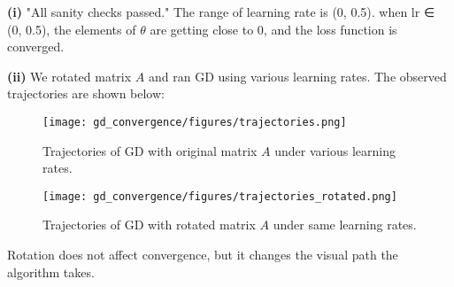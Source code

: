 \begin{answer}
\textbf{(i)}  
"All sanity checks passed."
The range of learning rate is (0, 0.5).
when lr ∈ (0, 0.5), the elements of \(\theta\) are getting close to 0, and the loss function is converged.


\textbf{(ii)}  
We rotated matrix $A$ and ran GD using various learning rates. The observed trajectories are shown below:

\begin{figure}[H]
  \centering
  \texttt{[image: gd\_convergence/figures/trajectories.png]}
  \caption{Trajectories of GD with original matrix $A$ under various learning rates.}
\end{figure}

\begin{figure}[H]
  \centering
  \texttt{[image: gd\_convergence/figures/trajectories\_rotated.png]}
  \caption{Trajectories of GD with rotated matrix $A$ under same learning rates.}
\end{figure}
Rotation does not affect convergence, but it changes the visual path the algorithm takes.


\end{answer}
